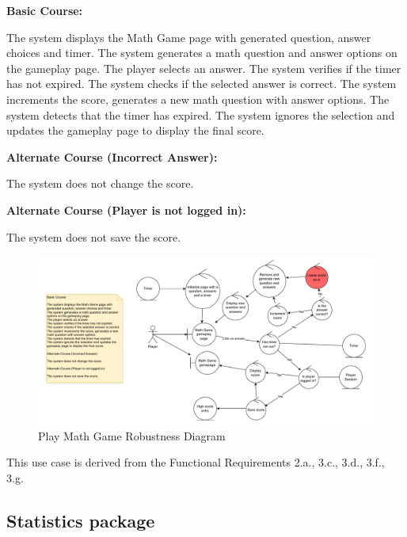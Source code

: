 \documentclass[11pt,a4paper]{article}
\newcommand{\heading}[1]{\vspace{1em}\noindent\textbf{#1}\par\vspace{0.5em}}
\begin{document}
\heading{Basic Course:}
The system displays the Math Game page with generated question, answer choices and timer. The system generates a math question and answer options on the gameplay page. The player selects an answer. The system verifies if the timer has not expired. The system checks if the selected answer is correct. The system increments the score, generates a new math question with answer options. The system detects that the timer has expired. The system ignores the selection and updates the gameplay page to display the final score.

\heading{Alternate Course (Incorrect Answer):}
The system does not change the score.

\heading{Alternate Course (Player is not logged in):}
The system does not save the score.

\begin{figure}[H]
    \centering
    \includegraphics[width=1\textwidth,keepaspectratio]{PSI_3rd_trial/robustness/math_game.drawio-1.pdf}
    \caption{Play Math Game Robustness Diagram}
    \label{fig:math_game_robustness_diagram}
\end{figure}

This use case is derived from the Functional Requirements 2.a., 3.c., 3.d., 3.f., 3.g.

\subsection{Statistics package}
\end{document}
